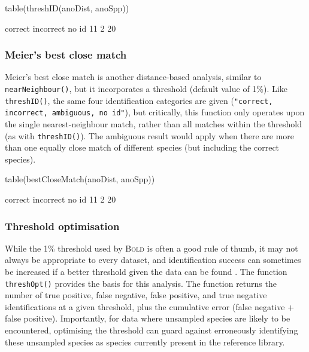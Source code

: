 \documentclass{article}
\newcommand{\progname}[1]{\textsc{#1}}
\newcommand{\fun}[1]{\texttt{#1}}
\begin{document}
\begin{console}
table(threshID(anoDist, anoSpp))
\end{console}

\begin{Routput}
  correct incorrect     no id 
       11         2        20 
\end{Routput}

\subsubsection{Meier's best close match}
Meier's best close match \citep{Meier.2006} is another distance-based analysis, similar to \fun{nearNeighbour()}, but it incorporates a threshold (default value of 1\%). Like \fun{threshID()}, the same four identification categories are given (\fun{"correct, incorrect, ambiguous, no id"}), but critically, this function only operates upon the single nearest-neighbour match, rather than all matches within the threshold (as with \fun{threshID()}). The ambiguous result would apply when there are more than one equally close match of different species (but including the correct species). 


\begin{console}
table(bestCloseMatch(anoDist, anoSpp))
\end{console}

\begin{Routput}
  correct incorrect     no id 
       11         2        20 
\end{Routput}

\subsubsection{Threshold optimisation} %
While the 1\% threshold used by \progname{Bold} is often a good rule of thumb, it may not always be appropriate to every dataset, and identification success can sometimes be increased if a better threshold given the data can be found  \citep{Meye.Paul.2005}.  The function \fun{threshOpt()} provides the basis for this analysis. The function returns the number of true positive, false negative, false positive, and true negative identifications at a given threshold, plus the cumulative error (false negative + false positive). Importantly, for data where unsampled species are likely to be encountered, optimising the threshold can guard against erroneously identifying these unsampled species as species currently present in the reference library.
\end{document}
